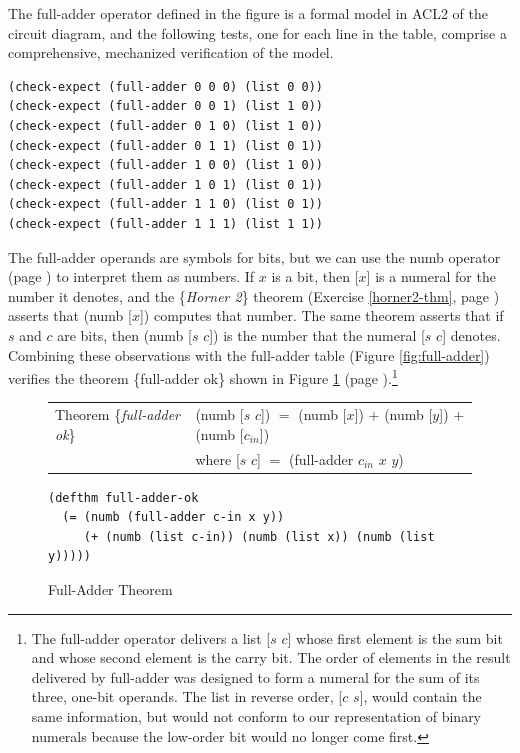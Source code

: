 The \textsf{full-adder} operator defined in the figure
is a formal model in ACL2 of the circuit diagram,
and the following tests, one for each line in the table,
comprise a comprehensive, mechanized verification of
the model.

\label{full-adder-model-check}
\begin{Verbatim}
(check-expect (full-adder 0 0 0) (list 0 0))
(check-expect (full-adder 0 0 1) (list 1 0))
(check-expect (full-adder 0 1 0) (list 1 0))
(check-expect (full-adder 0 1 1) (list 0 1))
(check-expect (full-adder 1 0 0) (list 1 0))
(check-expect (full-adder 1 0 1) (list 0 1))
(check-expect (full-adder 1 1 0) (list 0 1))
(check-expect (full-adder 1 1 1) (list 1 1))
\end{Verbatim}

The \textsf{full-adder} operands
are symbols for bits, but we can use the \textsf{numb} operator
(page \pageref{nmb-defun})
to interpret them as numbers.
If $x$ is a bit, then \textsf{[$x$]} is a numeral for
the number it denotes, and the \{\emph{Horner 2}\} theorem
(Exercise \ref{horner2-thm}, page \pageref{horner2-thm})
asserts that \textsf{(numb [$x$])} computes that number.
The same theorem asserts that if $s$ and $c$ are bits,
then \textsf{(numb [$s$ $c$])} is
the number that the numeral \textsf{[$s$ $c$]} denotes.
Combining these observations with the full-adder table
(Figure \ref{fig:full-adder})
verifies the theorem \{full-adder ok\} shown in
Figure \ref{fig:full-adder-thm} (page \pageref{fig:full-adder-thm}).\footnote{The
\textsf{full-adder} operator delivers a list \textsf{[$s$ $c$]} whose first
element is the sum bit and whose second element is the carry bit.
The order of elements in the result delivered by \textsf{full-adder} was designed
to form a numeral for the sum of its three, one-bit operands.
The list in reverse order, \textsf{[$c$ $s$]},
would contain the same information,
but would not conform to our representation of binary numerals
because the low-order bit would no longer come first.}

\begin{figure}
\begin{center}
\begin{tabular}{ll}
Theorem \{\emph{full-adder ok}\} & \textsf{(numb [$s$ $c$])} $=$ \textsf{(numb [$x$])} $+$ \textsf{(numb [$y$])} $+$ \textsf{(numb [$c_{in}$])} \\
                                 & where \textsf{[$s$ $c$]} $=$ \textsf{(full-adder $c_{in}$ $x$ $y$)} \\
\end{tabular}
\begin{Verbatim}
(defthm full-adder-ok
  (= (numb (full-adder c-in x y))
     (+ (numb (list c-in)) (numb (list x)) (numb (list y)))))
\end{Verbatim}
\end{center}
\caption{Full-Adder Theorem}
\label{fig:full-adder-thm}
\end{figure}


